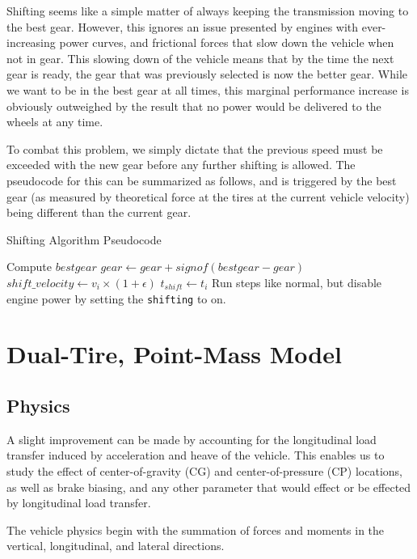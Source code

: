 \documentclass{article}
\begin{document}
Shifting seems like a simple matter of always keeping the transmission moving to the best gear. However, this ignores an issue presented by engines with ever-increasing power curves, and frictional forces that slow down the vehicle when not in gear. This slowing down of the vehicle means that by the time the next gear is ready, the gear that was previously selected is now the better gear. While we want to be in the best gear at all times, this marginal performance increase is obviously outweighed by the result that no power would be delivered to the wheels at any time.

To combat this problem, we simply dictate that the previous speed must be exceeded with the new gear before any further shifting is allowed. The pseudocode for this can be summarized as follows, and is triggered by the best gear (as measured by theoretical force at the tires at the current vehicle velocity) being different than the current gear.

\begin{algorithm}[H]
\caption{Shifting Algorithm Pseudocode}
\begin{algorithmic}[1]
	\State Compute $bestgear$
	\State $gear \gets gear + signof(bestgear - gear)$
	\State $shift\_velocity \gets v_i \times (1 + \epsilon)$
	\State $t_{shift} \gets t_i$
	\State Run steps like normal, but disable engine power by setting the \texttt{shifting} to on.
	\EndWhile
	\EndIf
\end{algorithmic}
\end{algorithm}

\section{Dual-Tire, Point-Mass Model}

\subsection{Physics}

A slight improvement can be made by accounting for the longitudinal load transfer induced by acceleration and heave of the vehicle. This enables us to study the effect of center-of-gravity (CG) and center-of-pressure (CP) locations, as well as brake biasing, and any other parameter that would effect or be effected by longitudinal load transfer.

The vehicle physics begin with the summation of forces and moments in the vertical, longitudinal, and lateral directions.
\end{document}

